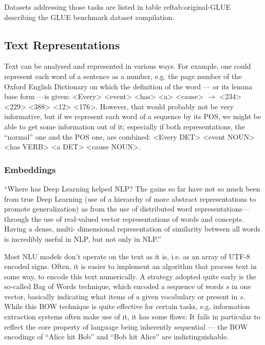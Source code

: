 Datasets addressing those tasks are listed in table ref{tab:original-GLUE} describing the GLUE
benchmark dataset compilation.


\subsection{Text Representations}

Text can be analysed and represented in various ways. For example, one could represent each word of a sentence as
a number, e.g. the page number of the Oxford English Dictionary on which the definition
of the word --- or its lemma base form ---is given: <Every> <event> <has> <a> <cause>
$\rightarrow$ <234> <229> <388> <12> <176>. However, that would probably not be very
informative, but if we represent each word of a sequence by its POS, we might be able to
get some information out of it; especially if both representations, the ``normal'' one
and the POS one, are combined: <Every DET> <event NOUN> <has VERB> <a DET> <cause NOUN>.


\subsubsection*{Embeddings}

{\color{red} ``Where has Deep Learning helped NLP? The gains so far have not so much been from
true Deep Learning (use of a hierarchy of more abstract representations to promote
generalization) as from the use of distributed word representations—through the use
of real-valued vector representations of words and concepts. Having a dense, multi-
dimensional representation of similarity between all words is incredibly useful in NLP,
but not only in NLP.'' \citep[p.~703]{manning2015computational}}

Most NLU models don't operate on the text as it is, i.e. as an array of UTF-8 encoded
signs. Often, it is easier to implement an algorithm that process text in some way, to
encode this text numerically. A strategy adopted quite early is the so-called Bag of
Words \citep{harris1954distributional} technique, which encoded a sequence of words $s$
in one vector, basically indicating what items of a given vocabulary or present in $s$.
While this BOW technique is quite effective for certain tasks, e.g. information extraction
systems often make use of it, it has some flaws: It fails in particular to reflect the core
property of language being inherently sequential --- the BOW encodings of ``Alice hit Bob''
and ``Bob hit Alice'' are indistinguishable.

